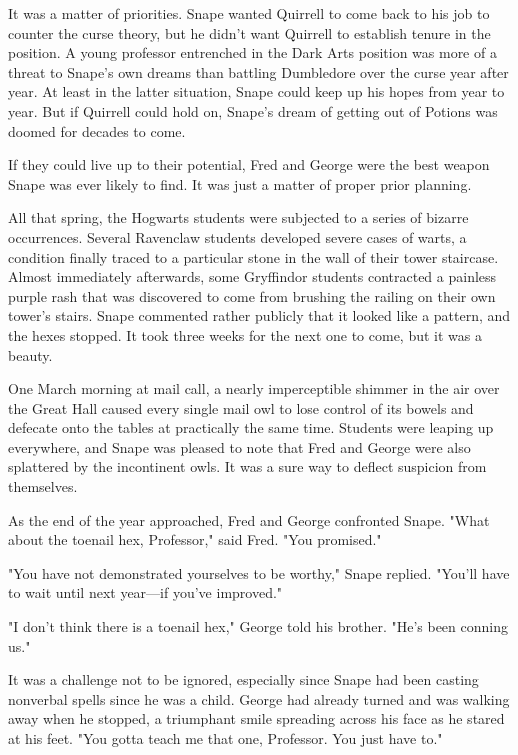 It was a matter of priorities. Snape wanted Quirrell to come back to his job to counter the curse theory, but he didn't want Quirrell to establish tenure in the position. A young professor entrenched in the Dark Arts position was more of a threat to Snape's own dreams than battling Dumbledore over the curse year after year. At least in the latter situation, Snape could keep up his hopes from year to year. But if Quirrell could hold on, Snape's dream of getting out of Potions was doomed for decades to come.

If they could live up to their potential, Fred and George were the best weapon Snape was ever likely to find. It was just a matter of proper prior planning.

All that spring, the Hogwarts students were subjected to a series of bizarre occurrences. Several Ravenclaw students developed severe cases of warts, a condition finally traced to a particular stone in the wall of their tower staircase. Almost immediately afterwards, some Gryffindor students contracted a painless purple rash that was discovered to come from brushing the railing on their own tower's stairs. Snape commented rather publicly that it looked like a pattern, and the hexes stopped. It took three weeks for the next one to come, but it was a beauty.

One March morning at mail call, a nearly imperceptible shimmer in the air over the Great Hall caused every single mail owl to lose control of its bowels and defecate onto the tables at practically the same time. Students were leaping up everywhere, and Snape was pleased to note that Fred and George were also splattered by the incontinent owls. It was a sure way to deflect suspicion from themselves.

As the end of the year approached, Fred and George confronted Snape. "What about the toenail hex, Professor," said Fred. "You promised."

"You have not demonstrated yourselves to be worthy," Snape replied. "You'll have to wait until next year—if you've improved."

"I don't think there is a toenail hex," George told his brother. "He's been conning us."

It was a challenge not to be ignored, especially since Snape had been casting nonverbal spells since he was a child. George had already turned and was walking away when he stopped, a triumphant smile spreading across his face as he stared at his feet. "You gotta teach me that one, Professor. You just have to."

